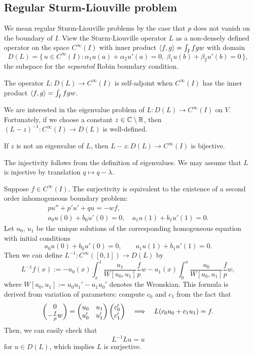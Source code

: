 \documentclass[11pt]{article}
\begin{document}
\subsection{Regular Sturm-Liouville problem}
We mean regular Sturm-Liouville problems by the case that $p$ does not vanish on the boundary of $I$.
View the Sturm-Liouville operator $L$ as a non-densely defined operator on the space $C^\infty(I)$ with inner product $\langle f,g\rangle=\int_Ifgw$ with domain
\[D(L)=\{\,u\in C^\infty(I):\alpha_1u(a)+\alpha_2u'(a)=0,\ \beta_1u(b)+\beta_2u'(b)=0\,\},\]
the subspace for the \emph{separated} Robin boundary condition.
\begin{prop}
The operator $L:D(L)\to C^\infty(I)$ is self-adjoint when $C^\infty(I)$ has the inner product $\langle f,g\rangle=\int_Ifgw$.
\end{prop}
We are interested in the eigenvalue problem of $L:D(L)\to C^\infty(I)$ on $V$.
Fortunately, if we choose a constant $z\in\mathbb{C}\setminus\mathbb{R}$, then $(L-z)^{-1}:C^\infty(I)\to D(L)$ is well-defined.
\begin{prop}
If $z$ is not an eigenvalue of $L$, then $L-z: D(L)\to C^\infty(I)$ is bijective.
\end{prop}
\begin{pf}
The injectivity follows from the definition of eigenvalues.
We may assume that $L$ is injective by translation $q\mapsto q-\lambda$.

Suppose $f\in C^\infty(I)$.
The surjectivity is equivalent to the existence of a second order inhomogeneous boundary problem:
\begin{gather*}
pu''+p'u'+qu=-wf,\\
a_0u(0)+b_0u'(0)=0,\quad a_1u(1)+b_1u'(1)=0.
\end{gather*}
Let $u_0$, $u_1$ be the unique solutions of the corresponding homogeneous equation with initial conditions
\[a_0u(0)+b_0u'(0)=0,\qquad a_1u(1)+b_1u'(1)=0.\]
Then we can define $L^{-1}:C^\infty([0,1])\to D(L)$ by
\[L^{-1}f(x):=-u_0(x)\int_x^1\frac{u_1}{W[u_0,u_1]}\frac fpw-u_1(x)\int_0^x\frac{u_0}{W[u_0,u_1]}\frac fpw,\]
where $W[u_0,u_1]:=u_0u_1'-u_1u_0'$ denotes the Wronskian.
This formula is derived from variation of parameters: compute $c_0$ and $c_1$ from the fact that
\[\begin{pmatrix}0\\-\frac fpw\end{pmatrix}=\begin{pmatrix}u_0&u_1\\u_0'&u_1'\end{pmatrix}\begin{pmatrix}c_0'\\c_1'\end{pmatrix}\impl L(c_0u_0+c_1u_1)=f.\]
Then, we can easily check that
\[L^{-1}Lu=u\]
for $u\in D(L)$, which implies $L$ is surjective.
\end{pf}
\end{document}
